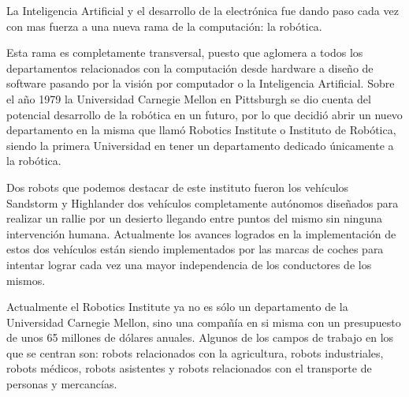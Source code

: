 La Inteligencia Artificial y el desarrollo de la electrónica fue dando paso cada vez con mas fuerza a una nueva rama de la computación: la robótica.

\vspace{10px}

Esta rama es completamente transversal, puesto que aglomera a todos los departamentos relacionados con la computación desde hardware a diseño de software pasando por la visión por computador o la Inteligencia Artificial. Sobre el año 1979 la Universidad Carnegie Mellon en Pittsburgh se dio cuenta del potencial desarrollo de la robótica en un futuro, por lo que decidió abrir un nuevo departamento en la misma que llamó Robotics Institute o Instituto de Robótica, siendo la primera Universidad en tener un departamento dedicado únicamente a la robótica.

\vspace{10px}

Dos robots que podemos destacar de este instituto fueron los vehículos Sandstorm y Highlander dos vehículos completamente autónomos diseñados para realizar un rallie por un desierto llegando entre puntos del mismo sin ninguna intervención humana. Actualmente los avances logrados en la implementación de estos dos vehículos están siendo implementados por las marcas de coches para intentar lograr cada vez una mayor independencia de los conductores de los mismos.

\vspace{10px}

Actualmente el Robotics Institute ya no es sólo un departamento de la Universidad Carnegie Mellon, sino una compañía en si misma con un presupuesto de unos 65 millones de dólares anuales. Algunos de los campos de trabajo en los que se centran son: robots relacionados con la agricultura, robots industriales, robots médicos, robots asistentes y robots relacionados con el transporte de personas y mercancías.
